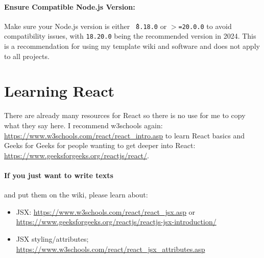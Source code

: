 \paragraph{Ensure Compatible Node.js Version:} Make sure your Node.js version is either \texttt{\^\ 8.18.0} or \texttt{$>$=20.0.0} to avoid compatibility issues, with \texttt{18.20.0} being the recommended version in 2024. 
This is a recommendation for using my template wiki and software and does not apply to all projects.

\section{Learning React}\label{sec:learning-react}
There are already many resources for React so there is no use for me to copy what they say here.
I recommend w3schools again: \url{https://www.w3schools.com/react/react_intro.asp} to learn React basics and Geeks
for Geeks for people wanting to get deeper into React: \url{https://www.geeksforgeeks.org/reactjs/react/}.
\paragraph{If you just want to write texts} and put them on the wiki, please learn about:
\begin{itemize}
    \item JSX: \url{https://www.w3schools.com/react/react_jsx.asp} or \url{https://www.geeksforgeeks.org/reactjs/reactjs-jsx-introduction/}
    \item JSX styling/attributes; \url{https://www.w3schools.com/react/react_jsx_attributes.asp}
\end{itemize}
